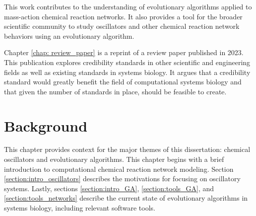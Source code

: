 \documentclass[12pt]{report}
\begin{document}
This work contributes to the understanding of evolutionary algorithms applied to mass-action chemical reaction networks. It also provides a tool for the broader scientific community to study oscillators and other chemical reaction network behaviors using an evolutionary algorithm.

Chapter \ref{chap: review_paper} is a reprint of a review paper published in 2023. This publication explores credibility standards in other scientific and engineering fields as well as existing standards in systems biology. It argues that a credibility standard would greatly benefit the field of computational systems biology and that given the number of standards in place, should be feasible to create. 

\chapter{Background}

This chapter provides context for the major themes of this dissertation: chemical oscillators and evolutionary algorithms. This chapter begins with a brief introduction to computational chemical reaction network modeling. Section \ref{section:intro_oscillators} describes the motivations for focusing on oscillatory systems. Lastly, sections \ref{section:intro_GA}, \ref{section:tools_GA}, and \ref{section:tools_networks} describe the current state of evolutionary algorithms in systems biology, including relevant software tools.
\end{document}
